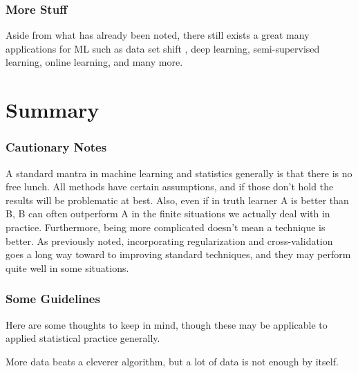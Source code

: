 \documentclass[english,nohyper,titlepage]{tufte-handout}\usepackage{knitr}
\begin{document}
\section{More Stuff}
Aside from what has already been noted, there still exists a great many applications for ML such as data set shift
, 
deep learning, 
semi-supervised learning, 
online learning, and many more.  














\part{Summary}
\section{Cautionary Notes}
A standard mantra in machine learning and statistics generally is that there is no free lunch.  All methods have certain assumptions, and if those don't hold the results will be problematic at best.  Also, even if in truth learner A is better than B, B can often outperform A in the finite situations we actually deal with in practice.  Furthermore, being more complicated doesn't mean a technique is better.  As previously noted, incorporating regularization and cross-validation goes a long way toward to improving standard techniques, and they may perform quite well in some situations.

\section{Some Guidelines}
Here are some thoughts to keep in mind, though these may be applicable to applied statistical practice generally.
\medskip

\noindent More data beats a cleverer algorithm, but a lot of data is not enough by itself. 
\end{document}
